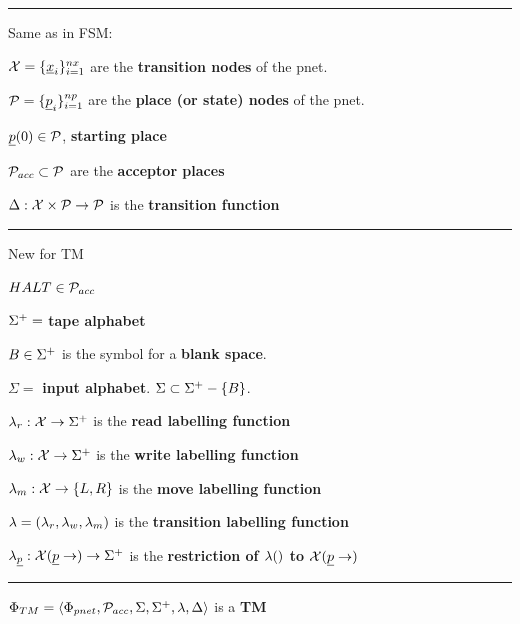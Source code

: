 \hrule
Same as in FSM:

$\calx =\{\rvx_i\}_{i=1}^{nx}$ are the {\bf transition nodes} of the pnet.

$\calp =\{\rvp_i\}_{i=1}^{np}$ are the {\bf place (or state) nodes} of the pnet.

$\rvp(0)\in \calp$, {\bf starting place }

${\cal P}_{acc}\subset {\cal P}$ are the 
{\bf acceptor places}

$\Delta:{\cal X}\times{\cal P}\rightarrow {\cal P}$ is the 
{\bf transition function}
\hrule
New for TM

$HALT\in {\cal P}_{acc}$

$\Sigma^+ =$ {\bf tape alphabet}

$B\in \Sigma^+$ is the  symbol for a {\bf blank space}.

$\Sigma=$ {\bf input alphabet}. $\Sigma\subset\Sigma^+-\{B\}$. 

$\lambda_{r}:{\cal X}\rightarrow \Sigma^+$ is the {\bf read  labelling function}

$\lambda_{w}:{\cal X}\rightarrow \Sigma^+$ is the {\bf write  labelling function}

$\lambda_{m}:{\cal X}\rightarrow \{L,R\}$ is the {\bf move 
labelling function}

$\lambda = (\lambda_r, \lambda_w, \lambda_m)$ is the
{\bf transition labelling function}

$\lam_\rvp: \calx(\rvp\rarrow)\rarrow \TA$ is the
{\bf restriction of $\lambda()$ to $\calx(\rvp\rarrow)$}

\hrule
$\Phi_{TM}=\left\langle\Phi_{pnet},{\cal P}_{acc}, \Sigma,
\Sigma^+, \lambda, \Delta\right\rangle$  is a {\bf TM}



